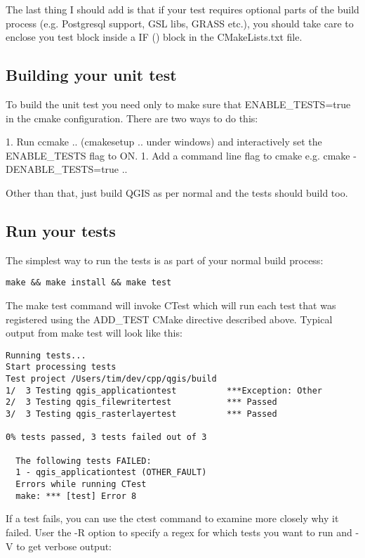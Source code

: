The last thing I should add is that if your test requires optional 
parts of the build process (e.g. Postgresql support, GSL libs, GRASS etc.), 
you should take care to enclose you test block inside a IF () block 
in the CMakeLists.txt file.

\subsection{Building your unit test}
To build the unit test you need only to make sure that ENABLE\_TESTS=true 
in the cmake configuration. There are two ways to do this:

 1. Run ccmake .. (cmakesetup .. under windows) and interactively set 
 the ENABLE\_TESTS flag to ON.
 1. Add a command line flag to cmake e.g. cmake -DENABLE\_TESTS=true ..

Other than that, just build QGIS as per normal and the tests should build 
too.

\subsection{Run your tests}
The simplest way to run the tests is as part of your normal build process:

\begin{verbatim}
make && make install && make test
\end{verbatim}

The make test command will invoke CTest which will run each test that 
was registered using the ADD\_TEST CMake directive described above. Typical 
output from make test will look like this:

\begin{verbatim}
Running tests...
Start processing tests
Test project /Users/tim/dev/cpp/qgis/build
1/  3 Testing qgis_applicationtest          ***Exception: Other
2/  3 Testing qgis_filewritertest           *** Passed
3/  3 Testing qgis_rasterlayertest          *** Passed

0% tests passed, 3 tests failed out of 3

  The following tests FAILED:
  1 - qgis_applicationtest (OTHER_FAULT)
  Errors while running CTest
  make: *** [test] Error 8
\end{verbatim}

If a test fails, you can use the ctest command to examine more 
closely why it failed. User the -R option to specify a regex for 
which tests you want to run and -V to get verbose output:

